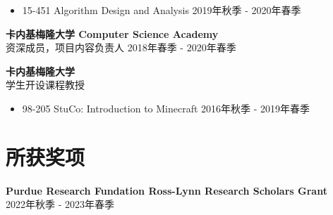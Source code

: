 \documentclass[margin, 10pt]{res} %
\begin{document}
\begin{resume}
\begin{itemize}
\item 15-451 Algorithm Design and Analysis \hfill 2019年秋季 - 2020年春季
\end{itemize}

{\bf 卡内基梅隆大学 Computer Science Academy}\\
资深成员，项目内容负责人 \hfill 2018年春季 - 2020年春季

{\bf 卡内基梅隆大学}\\
学生开设课程教授

\begin{itemize}
\item 98-205 StuCo: Introduction to Minecraft \hfill 2016年秋季 - 2019年春季
\end{itemize}

\section{所获奖项}
{\bf Purdue Research Fundation Ross-Lynn Research Scholars Grant} \\\hfill 2022年秋季 - 2023年春季


\end{resume}
\end{document}
